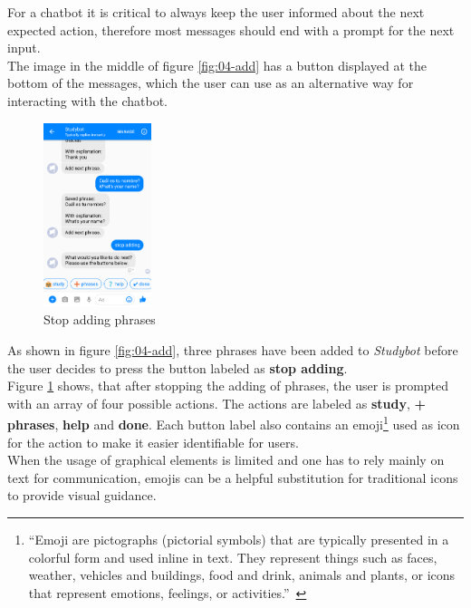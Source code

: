 For a chatbot it is critical to always keep the user informed about the next expected action,
therefore most messages should end with a prompt for the next input.
\\

The image in the middle of figure \ref{fig:04-add} has a button displayed at the bottom of the messages,
which the user can use as an alternative way for interacting with the chatbot.
\\

\begin{figure}
  \centering
  \includegraphics[width=0.28\textwidth]{images/interface/05-stop-adding.png}
	\caption{Stop adding phrases}
	\label{fig:05-stop-adding}
\end{figure}

As shown in figure \ref{fig:04-add}, three phrases have been added to \emph{Studybot}
before the user decides to press the button labeled as \textbf{stop adding}.
\\
Figure \ref{fig:05-stop-adding} shows, that after stopping the adding of phrases, the user is prompted with an array of four possible actions.
The actions are labeled as \textbf{study}, \textbf{+ phrases}, \textbf{help} and \textbf{done}.
Each button label also contains an emoji\footnote{``Emoji are pictographs (pictorial symbols) that are typically presented in a colorful form and used inline in text. They represent things such as faces, weather, vehicles and buildings, food and drink, animals and plants, or icons that represent emotions, feelings, or activities.''~\cite{emoji}} used as icon for the action to make it easier identifiable for users.
\\
When the usage of graphical elements is limited and one has to rely mainly on text for communication,
emojis can be a helpful substitution for traditional icons to provide visual guidance.
\\

